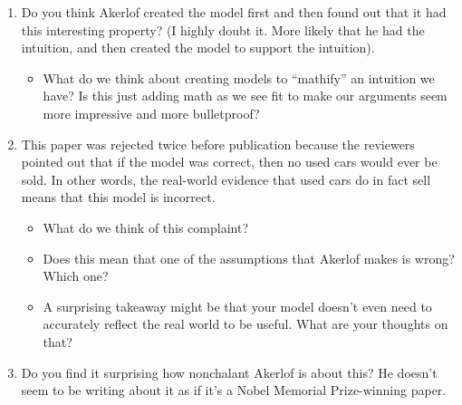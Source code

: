\documentclass[11pt]{article}
\begin{document}
\begin{enumerate}
    \item Do you think Akerlof created the model first and then found out that it had this interesting property? (I highly doubt it. More likely that he had the intuition, and then created the model to support the intuition).
    \begin{itemize}
        \item What do we think about creating models to ``mathify'' an intuition we have? Is this just adding math as we see fit to make our arguments seem more impressive and more bulletproof? 
    \end{itemize}
    \item This paper was rejected twice before publication because the reviewers pointed out that if the model was correct, then no used cars would ever be sold. In other words, the real-world evidence that used cars do in fact sell means that this model is incorrect.
    \begin{itemize}
        \item What do we think of this complaint?
        \item Does this mean that one of the assumptions that Akerlof makes is wrong? Which one?
        \item A surprising takeaway might be that your model doesn't even need to accurately reflect the real world to be useful. What are your thoughts on that?
    \end{itemize}
    \item Do you find it surprising how nonchalant Akerlof is about this? He doesn't seem to be writing about it as if it's a Nobel Memorial Prize-winning paper.
\end{enumerate}
\end{document}
